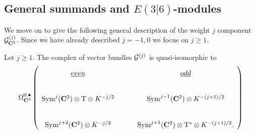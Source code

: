 \documentclass[../main.tex]{subfiles}
\begin{document}
%



\subsection{General summands and $E(3|6)$-modules}

We move on to give the following general description of the weight $j$ component $\mathcal{G}_{\mathbf{C}^3} ^{(j)}$.
Since we have already described $j = -1,0$ we focus on $j \geq 1$.

\begin{prop}
\label{prop:Vj}
Let $j \geq 1$. 
The complex of vector bundles $\mathcal{G}^{(j)}$ is quasi-isomorphic to
\begin{equation}
\label{eqn:Gj}
\Omega^{0,\bullet}_{\C^3} \left (\begin{tikzcd}
\ul{even} & \ul{odd} \\
\Sym^{j}(\C^2) \otimes \T \otimes K^{-j/2} & \Sym^{j-1}(\C^2) \otimes K^{-(j+1)/2}\\
\Sym^{j+2}(\C^2) \otimes K^{-j/2} & \Sym^{j+1}(\C^2) \otimes \T^* \otimes K^{-(j+1)/2} .
\end{tikzcd}\right )
\end{equation}
\end{prop}
\end{document}
